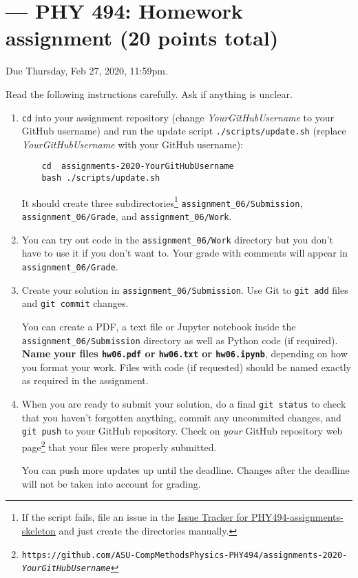 \documentclass[paper=letter]{scrartcl}
\newcommand{\anumber}{6}
\newcommand{\anum}{0\anumber}
\begin{document}

\setcounter{section}{\anumber}
\addtocounter{section}{-1}
\section{ --- PHY 494: Homework assignment (20 points total)}

\noindent Due Thursday, Feb 27, 2020, 11:59pm.

\noindent
Read the following instructions carefully. Ask if anything is unclear.
\begin{enumerate}
\item \texttt{cd} into your assignment repository (change
  \emph{YourGitHubUsername} to your GitHub username) and run the
  update script \texttt{./scripts/update.sh} (replace
  \emph{YourGitHubUsername} with your GitHub username):
  \begin{verbatim}
    cd  assignments-2020-YourGitHubUsername
    bash ./scripts/update.sh
  \end{verbatim}
  It should create three subdirectories\footnote{If the script fails,
    file an issue in the
    \href{https://github.com/ASU-CompMethodsPhysics-PHY494/PHY494-assignments-skeleton/issues}{Issue
      Tracker for PHY494-assignments-skeleton} and just create the
    directories manually.} \texttt{assignment\_\anum/Submission},
  \texttt{assignment\_\anum/Grade}, and
  \texttt{assignment\_\anum/Work}.
\item You can try out code in the \texttt{assignment\_\anum/Work}
  directory but you don't have to use it if you don't want to. Your
  grade with comments will appear in
  \texttt{assignment\_\anum/Grade}.
\item Create your solution in
  \texttt{assignment\_\anum/Submission}. Use Git to \texttt{git
    add} files and \texttt{git commit} changes.

  You can create a PDF, a text file or Jupyter notebook inside the
  \texttt{assignment\_\anum/Submission} directory as well as Python
  code (if required). \textbf{Name your files \texttt{hw\anum.pdf} or
    \texttt{hw\anum.txt} or \texttt{hw\anum.ipynb}}, depending on how
  you format your work. Files with code (if requested) should be named
  exactly as required in the assignment.
\item When you are ready to submit your solution, do a final
  \texttt{git status} to check that you haven't forgotten anything,
  commit any uncommited changes, and \texttt{git push} to your GitHub
  repository. Check on \emph{your} GitHub repository web
  page\footnote{\texttt{https://github.com/ASU-CompMethodsPhysics-PHY494/assignments-2020-\emph{YourGitHubUsername}}}
  that your files were properly submitted.

  You can push more updates up until the deadline. Changes after the
  deadline will not be taken into account for grading.
\end{enumerate}
\end{document}
